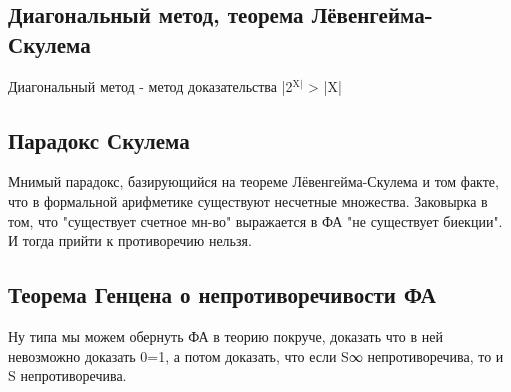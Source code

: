 \documentclass[12pt]{article}
\begin{document}
\subsection{Диагональный метод, теорема Лёвенгейма-Скулема}
\label{sec-2-43}
Диагональный метод - метод доказательства |2$^{\text{X|}}$ > |X|
\subsection{Парадокс Скулема}
\label{sec-2-44}
Мнимый парадокс, базирующийся на теореме Лёвенгейма-Скулема
и том факте, что в формальной арифметике существуют несчетные
множества. Заковырка в том, что "существует счетное мн-во" выражается
в ФА "не существует биекции". И тогда прийти к противоречию
нельзя.
\subsection{Теорема Генцена о непротиворечивости ФА}
\label{sec-2-45}
Ну типа мы можем обернуть ФА в теорию покруче, доказать что в ней
невозможно доказать 0=1, а потом доказать, что если S∞ непротиворечива,
то и S непротиворечива.





\end{document}
